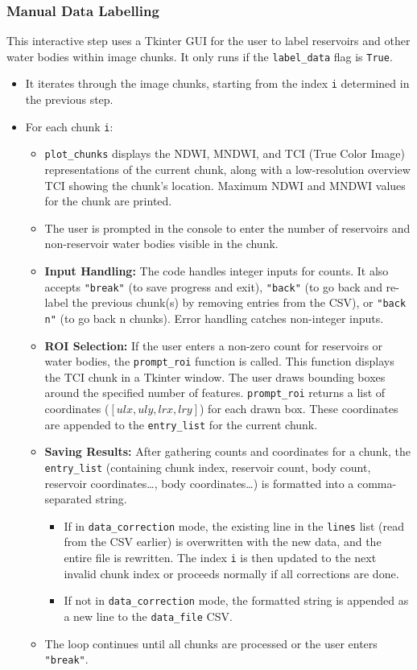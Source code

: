 \subsubsection{Manual Data Labelling}
This interactive step uses a Tkinter GUI for the user to label reservoirs and other water bodies within image chunks. It only runs if the \verb|label_data| flag is \verb|True|.
\begin{itemize}
    \item It iterates through the image chunks, starting from the index \verb|i| determined in the previous step.
    \item For each chunk \verb|i|:
        \begin{itemize}
            \item \verb|plot_chunks| displays the NDWI, MNDWI, and TCI (True Color Image) representations of the current chunk, along with a low-resolution overview TCI showing the chunk's location. Maximum NDWI and MNDWI values for the chunk are printed.
            \item The user is prompted in the console to enter the number of reservoirs and non-reservoir water bodies visible in the chunk.
            \item \textbf{Input Handling:} The code handles integer inputs for counts. It also accepts \texttt{"break"} (to save progress and exit), \texttt{"back"} (to go back and re-label the previous chunk(s) by removing entries from the CSV), or \texttt{"back n"} (to go back n chunks). Error handling catches non-integer inputs.
            \item \textbf{ROI Selection:} If the user enters a non-zero count for reservoirs or water bodies, the \verb|prompt_roi| function is called. This function displays the TCI chunk in a Tkinter window. The user draws bounding boxes around the specified number of features. \verb|prompt_roi| returns a list of coordinates (\([ulx, uly, lrx, lry]\)) for each drawn box. These coordinates are appended to the \verb|entry_list| for the current chunk.
            \item \textbf{Saving Results:} After gathering counts and coordinates for a chunk, the \verb|entry_list| (containing chunk index, reservoir count, body count, reservoir coordinates\ldots, body coordinates\ldots) is formatted into a comma-separated string.
                \begin{itemize}
                    \item If in \verb|data_correction| mode, the existing line in the \verb|lines| list (read from the CSV earlier) is overwritten with the new data, and the entire file is rewritten. The index \verb|i| is then updated to the next invalid chunk index or proceeds normally if all corrections are done.
                    \item If not in \verb|data_correction| mode, the formatted string is appended as a new line to the \verb|data_file| CSV.
                \end{itemize}
            \item The loop continues until all chunks are processed or the user enters \verb|"break"|.
        \end{itemize}
\end{itemize}

